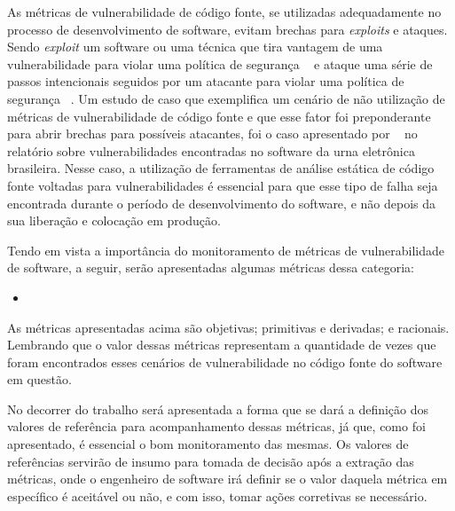 As métricas de vulnerabilidade de código fonte, se utilizadas adequadamente no processo de desenvolvimento de software, evitam
brechas para \textit{exploits} e ataques. Sendo \textit{exploit} um software ou uma técnica que tira vantagem de uma 
vulnerabilidade para violar uma política de segurança ~\cite{seacord&householder2005} e ataque uma série de passos intencionais 
seguidos por um atacante para violar uma política de segurança ~\cite{howard&longstaff98}. Um estudo de caso que exemplifica 
um cenário de não utilização de métricas de vulnerabilidade de código fonte e que esse fator foi preponderante para abrir
brechas para possíveis atacantes, foi o caso apresentado por ~\cite{aranha2012} no relatório sobre vulnerabilidades 
encontradas no software da urna eletrônica brasileira. Nesse caso, a utilização de ferramentas de análise estática de código
fonte voltadas para vulnerabilidades é essencial para que esse tipo de falha seja encontrada durante o período de 
desenvolvimento do software, e não depois da sua liberação e colocação em produção.

Tendo em vista a importância do monitoramento de métricas de vulnerabilidade de software, a seguir, serão apresentadas algumas
métricas dessa categoria:

\begin{itemize}
  \item
\end{itemize}

As métricas apresentadas acima são objetivas; primitivas e derivadas; e racionais. Lembrando que o valor dessas métricas
representam a quantidade de vezes que foram encontrados esses cenários de vulnerabilidade no código fonte do software em 
questão.

No decorrer do trabalho será apresentada a forma que se dará a definição dos valores de referência para acompanhamento dessas
métricas, já que, como foi apresentado, é essencial o bom monitoramento das mesmas. Os valores de referências servirão
de insumo para tomada de decisão após a extração das métricas, onde o engenheiro de software irá definir se o valor daquela
métrica em específico é aceitável ou não, e com isso, tomar ações corretivas se necessário.

